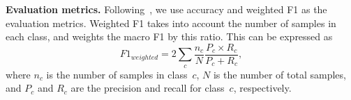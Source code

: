 \noindent\textbf{Evaluation metrics.}
Following~\citet{suresh-ong-2021-negatives}, we use accuracy and weighted F1 as
the evaluation metrics. Weighted F1 takes into account the number of samples in each
class, and weights the macro F1 by this ratio. This can be expressed as
\begin{equation}
    F1_{\mathit{weighted}} = 2 \sum_c \frac{n_c}{N} \frac{P_c \times R_c}{P_c + R_c},
\end{equation}
where $n_c$ is the number of samples in class~$c$, $N$ is the number of total
samples, and $P_c$ and $R_c$ are the precision and recall for class~$c$, respectively.

